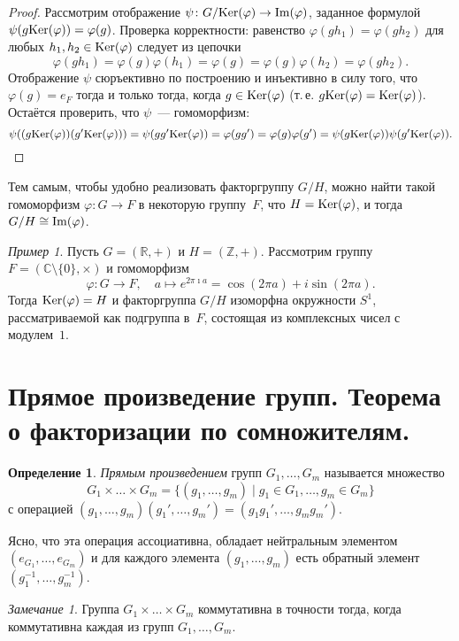 \documentclass[a4paper, 12pt]{article}
\def\Ker{{\rm Ker}}%
\def\Im{{\rm Im}}%
\def\CC{{\mathbb C}}%
\def\ZZ{{\mathbb Z}}%
\def\RR{{\mathbb R}}%
\theoremstyle{definition}
\newtheorem{definition}{Определение}
\theoremstyle{remark}
\newtheorem{remark}{Замечание}
\newtheorem{example}{Пример}
\begin{document}
\begin{proof}
Рассмотрим отображение $\psi \colon G / \Ker(\varphi) \to \Im(\varphi)$,
заданное формулой $\psi(g\Ker(\varphi)) = \varphi(g)$. Проверка
корректности: равенство $\varphi(gh_1)=\varphi(gh_2)$ для любых
$h_1,h_2\in\Ker(\varphi)$ следует из цепочки
$$
\varphi(gh_1)=\varphi(g)\varphi(h_1)=\varphi(g)=\varphi(g)\varphi(h_2)=\varphi(gh_2).
$$
Отображение $\psi$ сюръективно по построению и инъективно в силу
того, что $\varphi(g) = e_F$ тогда и только тогда, когда $g \in \Ker
(\varphi)$ (т.\,е. $g\Ker(\varphi) = \Ker(\varphi)$). Остаётся
проверить, что $\psi$~--- гомоморфизм:
$$
\psi((g\Ker(\varphi))(g'\Ker(\varphi))) = \psi(gg'\Ker(\varphi)) =
\varphi(gg') = \varphi(g)\varphi(g') =
\psi(g\Ker(\varphi))\psi(g'\Ker(\varphi)).
$$
\end{proof}

Тем самым, чтобы удобно реализовать факторгруппу $G/H$, можно найти
такой гомоморфизм $\varphi\colon G\to F$ в некоторую группу~$F$, что
$H = \Ker(\varphi)$, и тогда $G/H \cong \Im(\varphi)$.

\begin{example}
Пусть $G=(\RR,+)$ и $H=(\ZZ,+)$. Рассмотрим группу
$F=(\CC\setminus\{0\},\times)$ и гомоморфизм
$$
\varphi\colon G\to F, \quad a\mapsto e^{2\pi\imath a} = \cos (2\pi
a) + i \sin (2\pi a).
$$
Тогда $\Ker(\varphi)=H$ и факторгруппа $G/H$ изоморфна окружности
$S^1$, рассматриваемой как подгруппа в~$F$, состоящая из комплексных
чисел с модулем~$1$.
\end{example}


\section{Прямое произведение групп. Теорема о факторизации по сомножителям.}

\begin{definition}
{\it Прямым произведением} групп $G_1, \ldots, G_m$ называется
множество
$$
G_1\times\ldots\times G_m=\{(g_1,\ldots,g_m) \mid g_1\in G_1,\ldots,
g_m\in G_m\}
$$
с операцией
$(g_1,\ldots,g_m)(g_1',\ldots,g_m')=(g_1g_1',\ldots,g_mg_m')$.
\end{definition}

Ясно, что эта операция ассоциативна, обладает нейтральным элементом
$(e_{G_1},\ldots,e_{G_m})$ и для каждого элемента $(g_1,\ldots,g_m)$
есть обратный элемент $(g_1^{-1},\ldots,g_m^{-1})$.

\begin{remark}
Группа $G_1\times\ldots\times G_m$ коммутативна в точности тогда,
когда коммутативна каждая из групп $G_1,\ldots, G_m$.
\end{remark}
\end{document}
